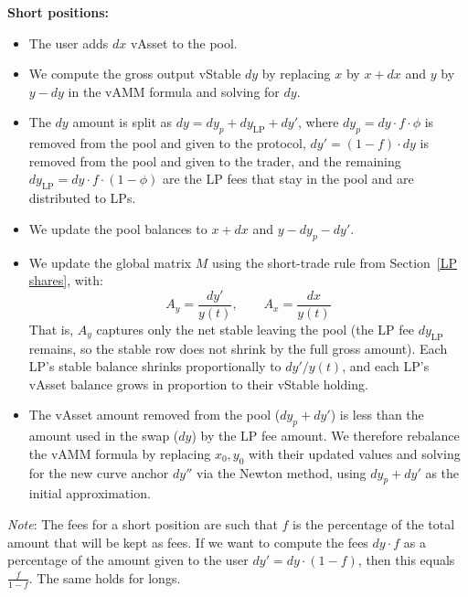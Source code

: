 \documentclass{article}
\begin{document}
\noindent\textbf{Short positions:}
\begin{itemize}

\item The user adds $dx$ vAsset to the pool.

\item We compute the gross output vStable $dy$ by replacing $x$ by $x + dx$ and $y$ by
      $y - dy$ in the vAMM formula and solving for $dy$.

\item The $dy$ amount is split as $dy = dy_p + dy_{\mathrm{LP}} + dy'$, where
      $dy_p = dy \cdot f \cdot \phi$ is removed from the pool and given to the protocol,
      $dy' = (1-f) \cdot dy$ is removed from the pool and given to the trader, and the
      remaining $dy_{\mathrm{LP}} = dy \cdot f \cdot (1-\phi)$ are the LP fees that stay in
      the pool and are distributed to LPs.

\item We update the pool balances to $x + dx$ and $y - dy_p - dy'$.

\item We update the global matrix $M$ using the short-trade rule from
      Section~\ref{LP shares}, with:
      \begin{equation}
        A_y = \frac{dy'}{y(t)}, \qquad A_x = \frac{dx}{y(t)}
      \end{equation}
      That is, $A_y$ captures only the net stable leaving the pool (the LP fee $dy_{\mathrm{LP}}$
      remains, so the stable row does not shrink by the full gross amount). Each LP's stable
      balance shrinks proportionally to $dy'/y(t)$, and each LP's vAsset balance grows in
      proportion to their vStable holding.

\item The vAsset amount removed from the pool ($dy_p + dy'$) is less than the amount used
      in the swap ($dy$) by the LP fee amount. We therefore rebalance the vAMM formula by
      replacing $x_0, y_0$ with their updated values and solving for the new curve anchor
      $dy''$ via the Newton method, using $dy_p + dy'$ as the initial approximation.

\end{itemize}

\noindent\textit{Note}: The fees for a short position are such that $f$ is the percentage of
the total amount that will be kept as fees. If we want to compute the fees $dy \cdot f$ as a
percentage of the amount given to the user $dy' = dy \cdot (1-f)$, then this equals
$\frac{f}{1-f}$. The same holds for longs.
\end{document}
